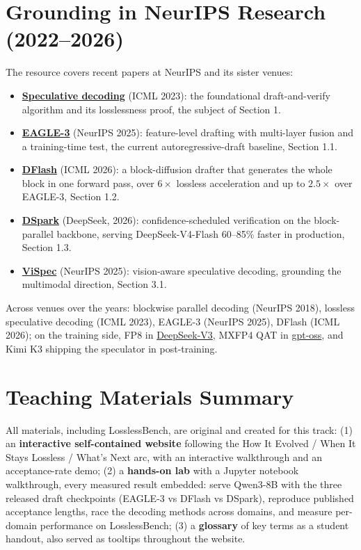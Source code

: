 \documentclass{article}
\begin{document}
\section{Grounding in NeurIPS Research (2022--2026)}
The resource covers recent papers at NeurIPS and its sister venues:
\begin{itemize}\small
  \item \href{https://arxiv.org/abs/2211.17192}{\textbf{Speculative decoding}} (ICML 2023): the foundational draft-and-verify algorithm and its losslessness proof, the subject of Section 1.
  \item \href{https://openreview.net/forum?id=4exx1hUffq}{\textbf{EAGLE-3}} (NeurIPS 2025): feature-level drafting with multi-layer fusion and a training-time test, the current autoregressive-draft baseline, Section 1.1.
  \item \href{https://icml.cc/virtual/2026/poster/64301}{\textbf{DFlash}} (ICML 2026): a block-diffusion drafter that generates the whole block in one forward pass, over $6\times$ lossless acceleration and up to $2.5\times$ over EAGLE-3, Section 1.2.
  \item \href{https://arxiv.org/abs/2607.05147}{\textbf{DSpark}} (DeepSeek, 2026): confidence-scheduled verification on the block-parallel backbone, serving DeepSeek-V4-Flash 60--85\% faster in production, Section 1.3.
  \item \href{https://neurips.cc/virtual/2025/poster/115277}{\textbf{ViSpec}} (NeurIPS 2025): vision-aware speculative decoding, grounding the multimodal direction, Section 3.1.
\end{itemize}
Across venues over the years: blockwise parallel decoding (NeurIPS 2018), lossless speculative decoding (ICML 2023), EAGLE-3 (NeurIPS 2025), DFlash (ICML 2026); on the training side, FP8 in \href{https://arxiv.org/abs/2412.19437}{DeepSeek-V3}, MXFP4 QAT in \href{https://arxiv.org/abs/2508.10925}{gpt-oss}, and Kimi K3 shipping the speculator in post-training.

\section{Teaching Materials Summary}
All materials, including LosslessBench, are original and created for this track: (1) an \textbf{interactive self-contained website} following the How It Evolved / When It Stays Lossless / What's Next arc, with an interactive walkthrough and an acceptance-rate demo; (2) a \textbf{hands-on lab} with a Jupyter notebook walkthrough, every measured result embedded: serve Qwen3-8B with the three released draft checkpoints (EAGLE-3 vs DFlash vs DSpark), reproduce published acceptance lengths, race the decoding methods across domains, and measure per-domain performance on LosslessBench; (3) a \textbf{glossary} of key terms as a student handout, also served as tooltips throughout the website.
\end{document}
